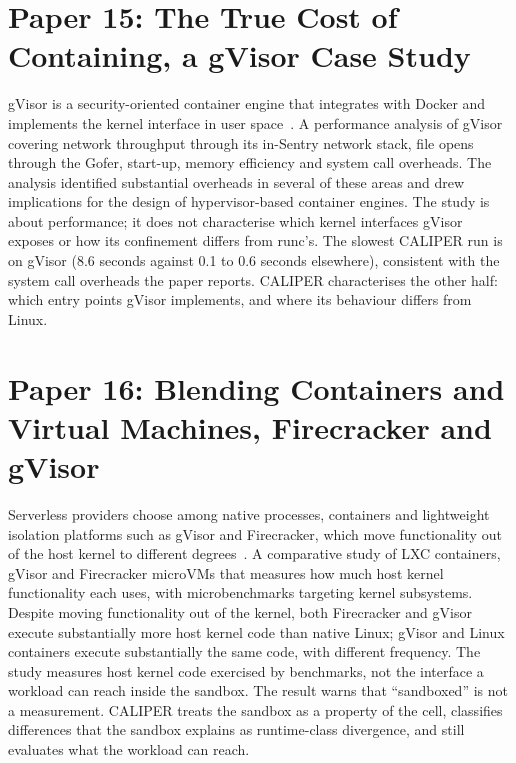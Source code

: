 \section{Paper 15: The True Cost of Containing, a gVisor Case Study}
\label{lit:gvisor}

 gVisor is a security-oriented container engine that integrates with Docker and implements the kernel interface in user space~\cite{young2019gvisor}.
 A performance analysis of gVisor covering network throughput through its in-Sentry network stack, file opens through the Gofer, start-up, memory efficiency and system call overheads.
 The analysis identified substantial overheads in several of these areas and drew implications for the design of hypervisor-based container engines.
 The study is about performance; it does not characterise which kernel interfaces gVisor exposes or how its confinement differs from runc's.
 The slowest CALIPER run is on gVisor (8.6 seconds against 0.1 to 0.6 seconds elsewhere), consistent with the system call overheads the paper reports. CALIPER characterises the other half: which entry points gVisor implements, and where its behaviour differs from Linux.

\section{Paper 16: Blending Containers and Virtual Machines, Firecracker and gVisor}
\label{lit:blending}

 Serverless providers choose among native processes, containers and lightweight isolation platforms such as gVisor and Firecracker, which move functionality out of the host kernel to different degrees~\cite{anjali2020blending}.
 A comparative study of LXC containers, gVisor and Firecracker microVMs that measures how much host kernel functionality each uses, with microbenchmarks targeting kernel subsystems.
 Despite moving functionality out of the kernel, both Firecracker and gVisor execute substantially more host kernel code than native Linux; gVisor and Linux containers execute substantially the same code, with different frequency.
 The study measures host kernel code exercised by benchmarks, not the interface a workload can reach inside the sandbox.
 The result warns that ``sandboxed'' is not a measurement. CALIPER treats the sandbox as a property of the cell, classifies differences that the sandbox explains as runtime-class divergence, and still evaluates what the workload can reach.

